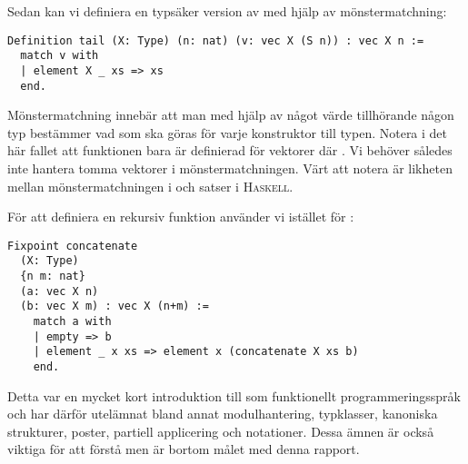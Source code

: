 Sedan kan vi definiera en typsäker version av  med hjälp av
mönstermatchning:
\begin{lstlisting}
Definition tail (X: Type) (n: nat) (v: vec X (S n)) : vec X n :=
  match v with
  | element X _ xs => xs
  end.
\end{lstlisting}
Mönstermatchning innebär att man med hjälp av något värde tillhörande någon typ
bestämmer vad som ska göras för varje konstruktor till typen. Notera i det här
fallet att funktionen bara är definierad för vektorer  där . Vi behöver således inte hantera tomma vektorer i mönstermatchningen. Värt
att notera är likheten mellan mönstermatchningen i \coq{} och  satser i
\textsc{Haskell}.

För att definiera en rekursiv funktion använder vi  istället för
:
\begin{lstlisting}
Fixpoint concatenate
  (X: Type)
  {n m: nat}
  (a: vec X n)
  (b: vec X m) : vec X (n+m) :=
    match a with
    | empty => b
    | element _ x xs => element x (concatenate X xs b)
    end.
\end{lstlisting}

Detta var en mycket kort introduktion till \coq{} som funktionellt
programmeringsspråk och har därför utelämnat bland annat modulhantering,
typklasser, kanoniska strukturer, poster, partiell applicering och notationer.
Dessa ämnen är också viktiga för att förstå \coq{} men är bortom målet med denna
rapport.
